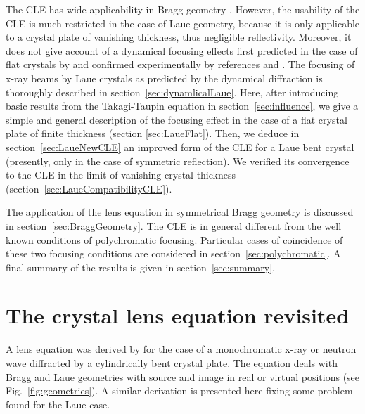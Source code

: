 \documentclass[preprint]{iucr}              %
\begin{document}
The CLE has wide applicability in Bragg geometry \cite{Caciuffo1987}. However, the usability of the CLE is much restricted in the case of Laue geometry, because it is only applicable to a crystal plate of vanishing thickness, thus negligible reflectivity. Moreover, it does not give account of a dynamical focusing effects first  predicted in the case of flat crystals by \cite{AfanasevKohn1977} and confirmed experimentally by references \cite{Aristov1978} and \cite{Aristov1980}. The focusing of x-ray beams by Laue crystals as predicted by the dynamical diffraction is  thoroughly described in section~\ref{sec:dynamlicalLaue}. Here, after introducing basic results from the Takagi-Taupin equation in section~\ref{sec:influence}, we give a simple and general description of the focusing effect in the case of a flat crystal plate of finite thickness (section \ref{sec:LaueFlat}). Then, we deduce in section~\ref{sec:LaueNewCLE} an improved form of the CLE for a Laue bent crystal (presently, only in the case of symmetric reflection). We verified its convergence to the CLE in the limit of vanishing crystal thickness (section~\ref{sec:LaueCompatibilityCLE}). 

The application of the lens equation in symmetrical Bragg geometry is discussed in section~\ref{sec:BraggGeometry}. %
The CLE is in general different from the well known conditions of polychromatic focusing. Particular cases of coincidence of these two focusing conditions are considered in section~\ref{sec:polychromatic}. A final summary of the results is given in section~\ref{sec:summary}.   


\section{The crystal lens equation revisited}
\label{sec:CLE}

A lens equation was derived by \cite{CK} for the case of a monochromatic x-ray or neutron wave diffracted by a cylindrically bent crystal plate. The equation deals with Bragg and Laue geometries with source and image in real or virtual positions (see Fig.~\ref{fig:geometries}). A similar derivation is presented here fixing some problem found for the Laue case.
\end{document}
